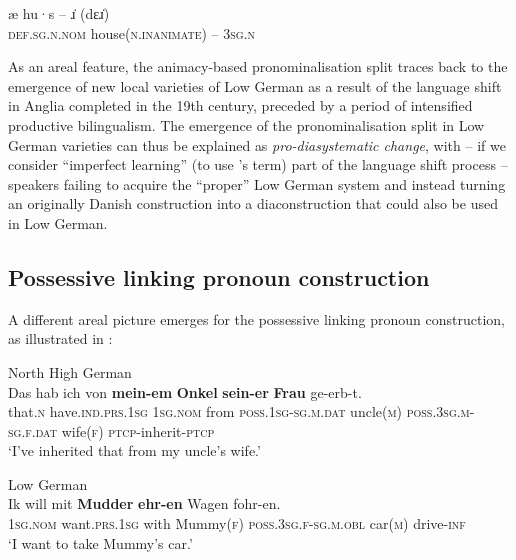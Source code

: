 \documentclass[output=paper]{langsci/langscibook}
\begin{document}
	\ex\label{ex:hoeder:14e}	
	\gll æ hu·s – ɹ̇ (dɛɹ̇)\\
     \textsc{def.sg.n.nom}{} house(\textsc{n.inanimate}) – 3\textsc{sg.n}\\
\z
\z

As an areal feature, the animacy-based pronominalisation split traces back to the emergence of new local varieties of Low German as a result of the language shift in Anglia completed in the 19th century, preceded by a period of intensified productive bilingualism. The emergence of the pronominalisation split in Low German varieties can thus be explained as \textit{pro-diasystematic change}, with – if we consider “imperfect learning” (to use \citeauthor{Thomason.1988}'s \citeyear{Thomason.1988} term) part of the language shift process – speakers failing to acquire the “proper” Low German system and instead turning an originally Danish construction into a diaconstruction that could also be used in Low German.


 
\subsection{Possessive linking pronoun construction}\label{sec:hoeder:4.5}


A different areal picture emerges for the possessive linking pronoun construction, as illustrated in :
 
\ea\label{ex:hoeder:15}
	\ea\label{ex:hoeder:15a}
	North High German\\
	\gll Das hab ich von \textbf{mein-em} \textbf{Onkel} \textbf{sein-er} \textbf{Frau} ge-erb-t.\\
     that.\textsc{n} have.\textsc{ind.prs.1sg} \textsc{1sg.nom}{} from \textsc{poss.1sg-sg.m.dat} uncle(\textsc{m}) \textsc{poss.3sg.m-sg.f.dat} wife(\textsc{f}) \textsc{ptcp-}inherit-\textsc{ptcp}\\
	\glt `I’ve inherited that from my uncle’s wife.'
	
	\ex\label{ex:hoeder:15b}
	Low German\\
	\gll Ik will mit \textbf{Mudder}{ } \textbf{ehr-en} Wagen fohr-en.\\
     \textsc{1sg.nom}{} want.\textsc{prs.1sg} with Mummy(\textsc{f}) \textsc{poss.3sg.f-sg.m.obl} car(\textsc{m}) drive-\textsc{inf}\\
	\glt `I want to take Mummy’s car.'
	
\z
\z
\end{document}
